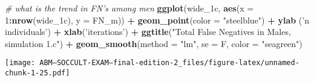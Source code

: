 \documentclass[]{article}
\newenvironment{Shaded}{\begin{snugshade}}{\end{snugshade}}
\newcommand{\KeywordTok}[1]{\textcolor[rgb]{0.13,0.29,0.53}{\textbf{#1}}}
\newcommand{\DataTypeTok}[1]{\textcolor[rgb]{0.13,0.29,0.53}{#1}}
\newcommand{\DecValTok}[1]{\textcolor[rgb]{0.00,0.00,0.81}{#1}}
\newcommand{\StringTok}[1]{\textcolor[rgb]{0.31,0.60,0.02}{#1}}
\newcommand{\CommentTok}[1]{\textcolor[rgb]{0.56,0.35,0.01}{\textit{#1}}}
\newcommand{\OperatorTok}[1]{\textcolor[rgb]{0.81,0.36,0.00}{\textbf{#1}}}
\newcommand{\NormalTok}[1]{#1}
\begin{document}
\begin{Shaded}
\begin{Highlighting}[]
\CommentTok{# what is the trend in FN's among men}
\KeywordTok{ggplot}\NormalTok{(wide_1c, }\KeywordTok{aes}\NormalTok{(}\DataTypeTok{x =} \DecValTok{1}\OperatorTok{:}\KeywordTok{nrow}\NormalTok{(wide_1c), }\DataTypeTok{y =}\NormalTok{ FN_m)) }\OperatorTok{+}\StringTok{ }
\StringTok{  }\KeywordTok{geom_point}\NormalTok{(}\DataTypeTok{color =} \StringTok{"steelblue"}\NormalTok{) }\OperatorTok{+}
\StringTok{  }\KeywordTok{ylab}\NormalTok{ (}\StringTok{'n individuals'}\NormalTok{) }\OperatorTok{+}\StringTok{ }\KeywordTok{xlab}\NormalTok{(}\StringTok{'iterations'}\NormalTok{) }\OperatorTok{+}
\StringTok{  }\KeywordTok{ggtitle}\NormalTok{(}\StringTok{"Total False Negatives in Males, simulation 1.c"}\NormalTok{) }\OperatorTok{+}
\StringTok{  }\KeywordTok{geom_smooth}\NormalTok{(}\DataTypeTok{method =} \StringTok{"lm"}\NormalTok{, }\DataTypeTok{se =}\NormalTok{ F, }\DataTypeTok{color =} \StringTok{"seagreen"}\NormalTok{)}
\end{Highlighting}
\end{Shaded}

\texttt{[image: ABM---SOCCULT-EXAM---final-edition-2\_files/figure-latex/unnamed-chunk-1-25.pdf]}
\end{document}
